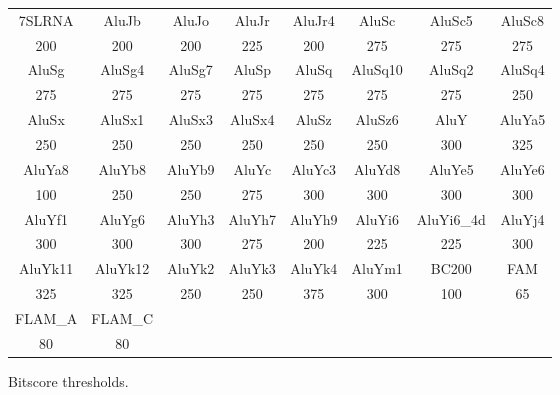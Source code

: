 \begin{figure} %
\centering
\begin{small}
\begin{tabular}{c c c c c c c c}\hline
7SLRNA&AluJb&AluJo&AluJr&AluJr4&AluSc&AluSc5&AluSc8\\
200   &200  &200  &225  &200   &275  &275   &275\\\hline
AluSg&AluSg4&AluSg7&AluSp&AluSq&AluSq10&AluSq2&AluSq4\\
275  &275   &275   &275  &275  &275    &275   &250\\\hline
AluSx&AluSx1&AluSx3&AluSx4&AluSz&AluSz6&AluY&AluYa5\\
250  &250   &250   &250   &250  &250   &300 &325\\\hline
AluYa8&AluYb8&AluYb9&AluYc&AluYc3&AluYd8&AluYe5&AluYe6\\
100   &250   &250   &275  &300   &300   &300   &300\\\hline
AluYf1&AluYg6&AluYh3&AluYh7&AluYh9&AluYi6&AluYi6\_4d&AluYj4\\
300   &300   &300   &275   &200   &225   &225       &300\\\hline
AluYk11&AluYk12&AluYk2&AluYk3&AluYk4&AluYm1&BC200&FAM\\
325    &325    &250   &250   &375   &300   &100  &65\\\hline
FLAM\_A&FLAM\_C\\
80     &80\\
\hline
\end{tabular}
\end{small}
\caption[Bitscore thresholds]
{Bitscore thresholds.}
\label{fig:dualbirth-bit-thresh}
\end{figure}

